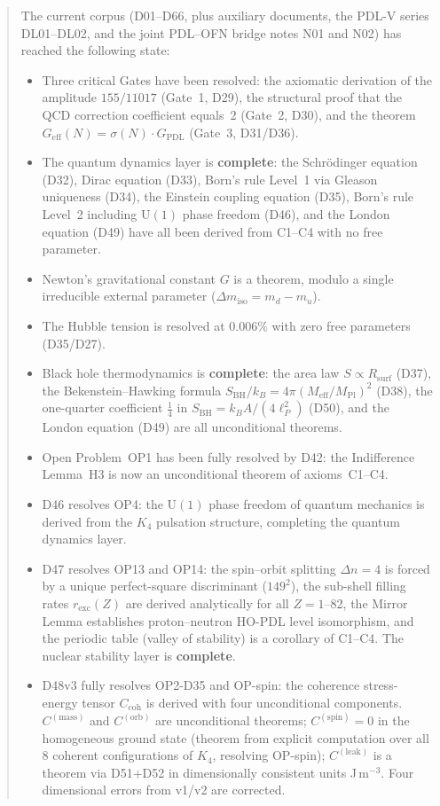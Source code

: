 \documentclass[11pt,a4paper]{article}
\theoremstyle{plain}
\theoremstyle{definition}
\theoremstyle{remark}
\newcommand{\Kfour}{K_4}
\newcommand{\Geff}{G_{\mathrm{eff}}}
\newcommand{\GPDL}{G_{\mathrm{PDL}}}
\newcommand{\Rsurf}{R_{\mathrm{surf}}}
\newcommand{\sigmaN}{\sigma(N)}
\newcommand{\SBH}{S_{\mathrm{BH}}}
\newcommand{\Meff}{M_{\mathrm{eff}}}
\newcommand{\MPl}{M_{\mathrm{Pl}}}
\newcommand{\Ccoh}{C_{\mathrm{coh}}}
\begin{document}
\begin{abstract}
The current corpus (D01--D66, plus auxiliary documents, the PDL-V series DL01--DL02, and the joint PDL--OFN bridge notes N01 and N02) has reached the following state:
\begin{itemize}
\item Three critical Gates have been resolved: the axiomatic derivation of the amplitude $155/11017$ (Gate~1, D29), the structural proof that the QCD correction coefficient equals~2 (Gate~2, D30), and the theorem $\Geff(N)=\sigmaN\cdot\GPDL$ (Gate~3, D31/D36).
\item The quantum dynamics layer is \textbf{complete}: the Schr\"odinger equation (D32), Dirac equation (D33), Born's rule Level~1 via Gleason uniqueness (D34), the Einstein coupling equation (D35), Born's rule Level~2 including $\mathrm{U}(1)$ phase freedom (D46), and the London equation (D49) have all been derived from C1--C4 with no free parameter.
\item Newton's gravitational constant $G$ is a theorem, modulo a single irreducible external parameter ($\Delta m_{\mathrm{iso}} = m_d - m_u$).
\item The Hubble tension is resolved at $0.006\%$ with zero free parameters (D35/D27).
\item Black hole thermodynamics is \textbf{complete}: the area law $S \propto \Rsurf$ (D37), the Bekenstein--Hawking formula $\SBH/k_B = 4\pi(\Meff/\MPl)^2$ (D38), the one-quarter coefficient $\tfrac{1}{4}$ in $\SBH = k_B A/(4\ell_P^2)$ (D50), and the London equation (D49) are all unconditional theorems.
\item Open Problem~OP1 has been fully resolved by D42: the Indifference Lemma~H3 is now an unconditional theorem of axioms~C1--C4.
\item D46 resolves OP4: the $\mathrm{U}(1)$ phase freedom of quantum mechanics is derived from the $\Kfour$ pulsation structure, completing the quantum dynamics layer.
\item D47 resolves OP13 and OP14: the spin--orbit splitting $\Delta n = 4$ is forced by a unique perfect-square discriminant ($149^2$), the sub-shell filling rates $r_{\mathrm{exc}}(Z)$ are derived analytically for all $Z = 1$--82, the Mirror Lemma establishes proton--neutron HO-PDL level isomorphism, and the periodic table (valley of stability) is a corollary of C1--C4. The nuclear stability layer is \textbf{complete}.
\item D48v3 fully resolves OP2-D35 and OP-spin: the coherence stress-energy tensor $\Ccoh$ is derived with four unconditional components. $C^{(\mathrm{mass})}$ and $C^{(\mathrm{orb})}$ are unconditional theorems; $C^{(\mathrm{spin})}=0$ in the homogeneous ground state (theorem from explicit computation over all 8 coherent configurations of $K_4$, resolving OP-spin); $C^{(\mathrm{leak})}$ is a theorem via D51+D52 in dimensionally consistent units J\,m$^{-3}$. Four dimensional errors from v1/v2 are corrected.

\end{itemize}
\end{abstract}
\end{document}
